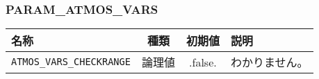 

\subsubsection{PARAM\_ATMOS\_VARS}
\begin{tabularx}{150mm}{|l|c|c|X|} \hline
 \rowcolor[gray]{0.9} 名称 & 種類 & 初期値 & 説明 \\ \hline
 \verb|ATMOS_VARS_CHECKRANGE| & 論理値 & .false. & わかりません。 \\ \hline
\end{tabularx}

